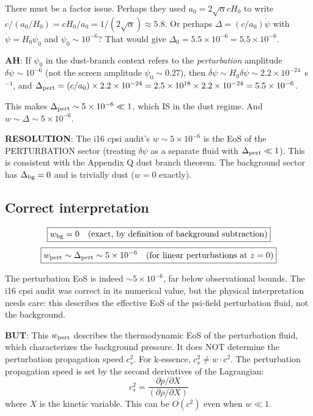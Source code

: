 \documentclass[11pt]{article}
\newcommand{\ee}[1]{\times 10^{#1}}
\begin{document}
There must be a factor issue. Perhaps they used $a_0 = 2\sqrt{\alpha} c H_0$
to write $c/(a_0/H_0) = c H_0 / a_0 = 1/(2\sqrt{\alpha}) \approx 5.8$.
Or perhaps $\Delta = (c/a_0) \dot\psi$ with $\dot\psi = H_0 \psi_0$
and $\psi_0 \sim 10^{-6}$? That would give
$\Delta_0 = 5.5 \times 10^{-6} = 5.5\ee{-6}$.

\textbf{AH}: If $\psi_0$ in the dust-branch context refers to the
\emph{perturbation} amplitude $\delta\psi \sim 10^{-6}$ (not the
screen amplitude $\psi_0 \sim 0.27$), then
$\dot{\delta\psi} \sim H_0 \delta\psi \sim 2.2\ee{-24}$~s$^{-1}$,
and $\Delta_{\rm pert} = (c/a_0) \times 2.2\ee{-24}
= 2.5\ee{18} \times 2.2\ee{-24} = 5.5\ee{-6}$.

This makes $\Delta_{\rm pert} \sim 5\ee{-6} \ll 1$, which IS in
the dust regime. And $w \sim \Delta \sim 5\ee{-6}$.

\textbf{RESOLUTION}: The i16 cpsi audit's $w \sim 5\ee{-6}$ is
the EoS of the PERTURBATION sector (treating $\delta\psi$ as a
separate fluid with $\Delta_{\rm pert} \ll 1$). This is consistent
with the Appendix Q dust branch theorem. The background sector
has $\Delta_{\rm bg} = 0$ and is trivially dust ($w = 0$ exactly).

\subsection{Correct interpretation}

\begin{equation}
\boxed{w_{\rm bg} = 0 \quad (\text{exact, by definition of background subtraction})}
\end{equation}
\begin{equation}
\boxed{w_{\rm pert} \sim \Delta_{\rm pert} \sim 5\ee{-6} \quad (\text{for linear perturbations at } z = 0)}
\end{equation}

The perturbation EoS is indeed $\sim 5\ee{-6}$, far below observational
bounds. The i16 cpsi audit was correct in its numerical value,
but the physical interpretation needs care: this describes the
effective EoS of the psi-field perturbation fluid, not the
background.

\textbf{BUT}: This $w_{\rm pert}$ describes the thermodynamic EoS
of the perturbation fluid, which characterizes the background pressure.
It does NOT determine the perturbation propagation speed $c_s^2$.
For k-essence, $c_s^2 \neq w \cdot c^2$. The perturbation propagation
speed is set by the second derivatives of the Lagrangian:
\begin{equation}
c_s^2 = \frac{\partial p / \partial X}{(\partial \rho / \partial X)}
\end{equation}
where $X$ is the kinetic variable. This can be $O(c^2)$ even when
$w \ll 1$.
\end{document}
